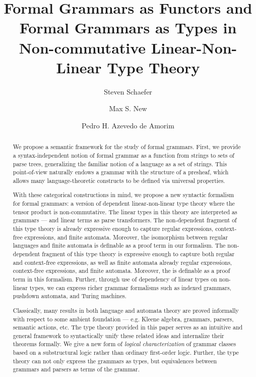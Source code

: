 \documentclass[sigconf,review,screen]{acmart}
\begin{document}
\title{Formal Grammars as Functors and Formal Grammars as Types in Non-commutative Linear-Non-Linear Type Theory}
\author{Steven Schaefer}

\author{Max S. New}

\author{Pedro H. Azevedo de Amorim}

\begin{abstract}
  We propose a semantic framework for the study of formal grammars. First, we
  provide a syntax-independent notion of formal grammar as a function from
  strings to sets of parse trees, generalizing the familiar notion of a language
  as a set of strings. This point-of-view naturally endows a grammar with the
  structure of a presheaf, which allows many language-theoretic constructs to be
  defined via universal properties.

  With these categorical constructions in mind, we propose a new syntactic
  formalism for formal grammars: a version of dependent linear-non-linear type
  theory where the tensor product is non-commutative. The linear types in this
  theory are interpreted as grammars --- and linear terms as parse transformers.
  The non-dependent fragment of this type theory is already expressive enough to
  capture regular expressions, context-free expressions, and finite automata.
  Moreover, the isomorphism between regular languages and finite automata is
  definable as a proof term in our formalism. The
  non-dependent fragment of this type theory is expressive enough to capture
  both regular and context-free expressions, as well as finite automata already
  regular expressions, context-free expressions, and finite automata. Moreover,
  the is definable as a proof term in this formalism. Further, through use of
  dependency of linear types on non-linear types, we can express richer grammar
  formalisms such as indexed grammars, pushdown automata, and Turing machines.

  Classically, many results in both language and automata theory are proved
  informally with respect to some ambient foundation --- e.g. Kleene algebra, grammars,
  parsers, semantic actions, etc. The type theory provided in
  this paper serves as an intuitive and general framework to syntactically unify
  these related ideas and internalize their
  theorems formally. We give a new form of \emph{logical characterization} of
  grammar classes based on a substructural logic rather than ordinary
  first-order logic. Further, the type theory can not only
  express the grammars as types, but equivalences between grammars and
  parsers as terms of the grammar.


\end{abstract}
\end{document}
